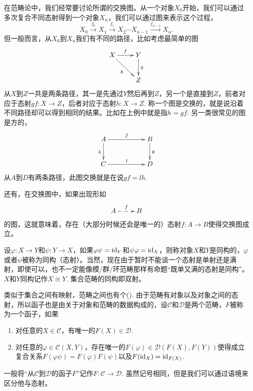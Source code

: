 \para 在范畴论中，我们经常要讨论所谓的交换图。从一个对象$X_0$开始，我们可以通过多次复合不同态射得到一个对象$X_n$，我们可以通过图来表示这个过程，
\[
	X_0\xrightarrow{f_0} X_1\xrightarrow{f_1} X_2\cdots X_{n-1}\xrightarrow{f_{n-1}} X_n.
\]
但一般而言，从$X_0$到$X_n$我们有不同的路径，比如考虑最简单的图
\[
\begin{xy}
	\xymatrix{
		X\ar[r]^{f} \ar[dr]_{h}&Y \ar[d]^{g}\\
		&Z
	}
\end{xy}
\]
从$X$到$Z$一共是两条路径，其一是先通过$Y$然后再到$Z$，另一个是直接到$Z$，前者对应于态射$gf:X\to Z$，后者对应于态射$h:X\to Z$. 称一个图是交换的，就是说沿着不同路径却可以得到相同的结果。比如在上例中就是指$h=gf$. 另一类很常见的图是方的，
\[
\begin{xy}
	\xymatrix{
		A\ar[rr]^{f} \ar[d]_{h}&&B \ar[d]^{g}\\
		C\ar[rr]^{l}&&D
	}
\end{xy}
\]
从$A$到$D$有两条路径，此图交换就是在说$gf=lh$. 

还有，在交换图中，如果出现形如
\[
\begin{xy}
	\xymatrix{
		A\ar@{-->}[r]^{f}&B
	}
\end{xy}
\]
的图，这就意味着，存在（大部分时候还会是唯一的）态射$f:A\to B$使得交换图成立。

\para 设$\varphi:X\to Y$和$\psi:Y\to X$，如果$\varphi\psi=\operatorname{id}_Y$和$\psi\varphi=\operatorname{id}_X$，则称对象$X$和$Y$是同构的，$\varphi$或者$\psi$被称为同构（态射）。当然，现在由于暂时不能谈一个态射是单射还是满射，即使可以，也不一定能像模/群/环范畴那样有命题“既单又满的态射是同构”。$X$和$Y$同构记作$X\cong Y$. 集合范畴的同构即双射。

\para 类似于集合之间有映射，范畴之间也有个(). 由于范畴有对象以及对象之间的态射，所以函子也是由关于对象和范畴的数据构成的，设$\mathcal{C}$和$\mathcal{D}$是两个范畴，$F$被称为一个函子，如果
\begin{enumerate}
	\item 对任意的$X\in \mathcal{C}$，有唯一的$F(X)\in \mathcal{D}$.
	
	\item 对任意的$\varphi\in \mathcal{C}(X,Y)$，存在唯一的$F(\varphi)\in  \mathcal{D}(F(X),F(Y))$使得成立复合关系$F(\varphi\psi)=F(\varphi)F(\psi)$以及$F(\operatorname{id}_X)=\operatorname{id}_{F(X)}$.
\end{enumerate}

一般将“从$\mathcal{C}$到$\mathcal{D}$的函子$F$”记作$F:\mathcal{C}\to \mathcal{D}$. 虽然记号相同，但是我们可以通过语境来区分他与态射。

